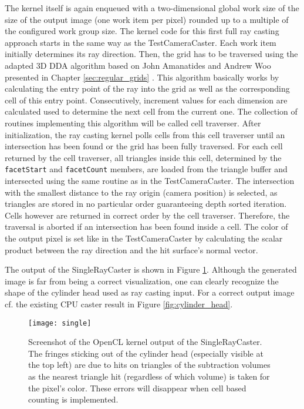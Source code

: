 The kernel itself is again enqueued with a two-dimensional global work size of the size of the output image (one work item per pixel) rounded up to a multiple of the configured work group size. The kernel code for this first full ray casting approach starts in the same way as the TestCameraCaster. Each work item initially determines its ray direction. Then, the grid has to be traversed using the adapted 3D DDA algorithm based on John Amanatides and Andrew Woo presented in Chapter \ref{sec:regular_grids} \cite{3DDDA}. This algorithm basically works by calculating the entry point of the ray into the grid as well as the corresponding cell of this entry point. Consecutively, increment values for each dimension are calculated used to determine the next cell from the current one. The collection of routines implementing this algorithm will be called cell traverser. After initialization, the ray casting kernel polls cells from this cell traverser until an intersection has been found or the grid has been fully traversed. For each cell returned by the cell traverser, all triangles inside this cell, determined by the \lstinline!facetStart! and \lstinline!facetCount! members, are loaded from the triangle buffer and intersected using the same routine as in the TestCameraCaster. The intersection with the smallest distance to the ray origin (camera position) is selected, as triangles are stored in no particular order guaranteeing depth sorted iteration. Cells however are returned in correct order by the cell traverser. Therefore, the traversal is aborted if an intersection has been found inside a cell. The color of the output pixel is set like in the TestCameraCaster by calculating the scalar product between the ray direction and the hit surface's normal vector.

The output of the SingleRayCaster is shown in Figure \ref{fig:single}. Although the generated image is far from being a correct visualization, one can clearly recognize the shape of the cylinder head used as ray casting input. For a correct output image cf. the existing CPU caster result in Figure \ref{fig:cylinder_head}.

\begin{figure}
\centering
\texttt{[image: single]}
\caption{Screenshot of the OpenCL kernel output of the SingleRayCaster. The fringes sticking out of the cylinder head (especially visible at the top left) are due to hits on triangles of the subtraction volumes as the nearest triangle hit (regardless of which volume) is taken for the pixel's color. These errors will disappear when cell based counting is implemented.}
\label{fig:single}
\end{figure}


